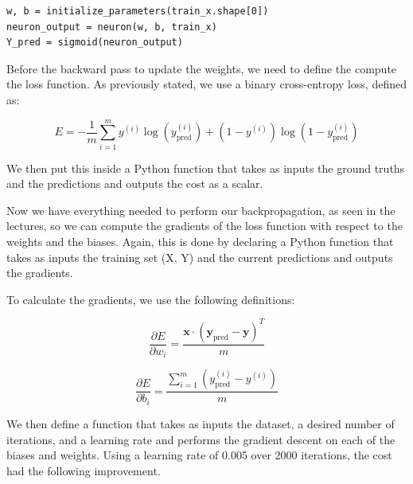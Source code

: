 \documentclass{thesisreport}
\begin{document}
\begin{lstlisting}
w, b = initialize_parameters(train_x.shape[0])
neuron_output = neuron(w, b, train_x)
Y_pred = sigmoid(neuron_output)
\end{lstlisting}

Before the backward pass to update the weights, we need to define the compute the loss function. As previously stated, we use a binary cross-entropy loss, defined as:

\begin{equation}
E = -\frac{1}{m}\sum_{i=1}^{m} y^{(i)} \log(y_{\text{pred}}^{(i)}) + (1 - y^{(i)}) \log(1 - y_{\text{pred}}^{(i)})
\end{equation}

We then put this inside a Python function that takes as inputs the ground truths and the predictions and outputs the cost as a scalar.

Now we have everything needed to perform our backpropagation, as seen in the lectures, so we can compute the gradients of the loss function with respect to the weights and the biases. Again, this is done by declaring a Python function that takes as inputs the training set (X, Y) and the current predictions and outputs the gradients.

To calculate the gradients, we use the following definitions:

\begin{equation}
\frac{\partial E}{\partial w_i} = \frac{\mathbf{x} \cdot (\mathbf{y}_{\text{pred}} - \mathbf{y})^T}{m}
\end{equation}

\begin{equation}
\frac{\partial E}{\partial b_i} = \frac{\sum_{i=1}^{m} (y_{\text{pred}}^{(i)} - y^{(i)})}{m}
\end{equation}

We then define a function that takes as inputs the dataset, a desired number of iterations, and a learning rate and performs the gradient descent on each of the biases and weights. Using a learning rate of 0.005 over 2000 iterations, the cost had the following improvement.
\end{document}
